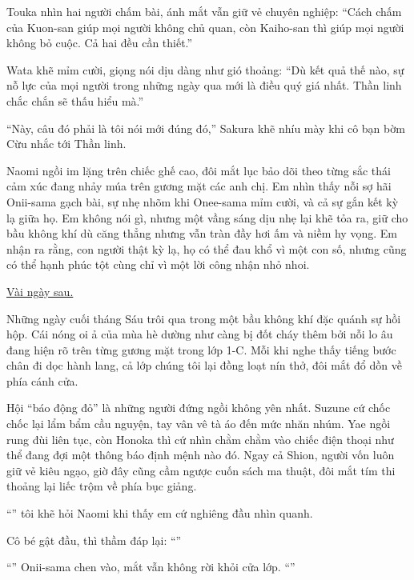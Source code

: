 \documentclass[../main.tex]{subfiles}
\begin{document}
Touka nhìn hai người chấm bài, ánh mắt vẫn giữ vẻ chuyên nghiệp: ``Cách chấm của Kuon-san giúp mọi người không chủ quan, còn Kaiho-san thì giúp mọi người không bỏ cuộc. Cả hai đều cần thiết.''

Wata khẽ mỉm cười, giọng nói dịu dàng như gió thoảng: ``Dù kết quả thế nào, sự nỗ lực của mọi người trong những ngày qua mới là điều quý giá nhất. Thần linh chắc chắn sẽ thấu hiểu mà.''

``Này, câu đó phải là tôi nói mới đúng đó,'' Sakura khẽ nhíu mày khi cô bạn bờm Cừu nhắc tới Thần linh.

Naomi ngồi im lặng trên chiếc ghế cao, đôi mắt lục bảo dõi theo từng sắc thái cảm xúc đang nhảy múa trên gương mặt các anh chị. Em nhìn thấy nỗi sợ hãi Onii-sama gạch bài, sự nhẹ nhõm khi Onee-sama mỉm cười, và cả sự gắn kết kỳ lạ giữa họ. Em không nói gì, nhưng một vầng sáng dịu nhẹ lại khẽ tỏa ra, giữ cho bầu không khí dù căng thẳng nhưng vẫn tràn đầy hơi ấm và niềm hy vọng. Em nhận ra rằng, con người thật kỳ lạ, họ có thể đau khổ vì một con số, nhưng cũng có thể hạnh phúc tột cùng chỉ vì một lời công nhận nhỏ nhoi.

\begin{center}
  \uline{Vài ngày sau.}
\end{center}

Những ngày cuối tháng Sáu trôi qua trong một bầu không khí đặc quánh sự hồi hộp. Cái nóng oi ả của mùa hè dường như càng bị đốt cháy thêm bởi nỗi lo âu đang hiện rõ trên từng gương mặt trong lớp 1-C. Mỗi khi nghe thấy tiếng bước chân đi dọc hành lang, cả lớp chúng tôi lại đồng loạt nín thở, đôi mắt đổ dồn về phía cánh cửa.

Hội ``báo động đỏ'' là những người đứng ngồi không yên nhất. Suzune cứ chốc chốc lại lẩm bẩm cầu nguyện, tay vân vê tà áo đến mức nhăn nhúm. Yae ngồi rung đùi liên tục, còn Honoka thì cứ nhìn chằm chằm vào chiếc điện thoại như thể đang đợi một thông báo định mệnh nào đó. Ngay cả Shion, người vốn luôn giữ vẻ kiêu ngạo, giờ đây cũng cầm ngược cuốn sách ma thuật, đôi mắt tím thi thoảng lại liếc trộm về phía bục giảng.

``'' tôi khẽ hỏi Naomi khi thấy em cứ nghiêng đầu nhìn quanh.

Cô bé gật đầu, thì thầm đáp lại: ``''

``'' Onii-sama chen vào, mắt vẫn không rời khỏi cửa lớp. ``''
\end{document}
